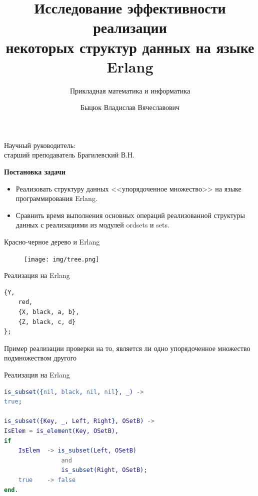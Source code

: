 \documentclass{beamer}
\title[]{Исследование эффективности реализации\\некоторых структур данных на языке Erlang}
\subtitle[ПМИ]{Прикладная математика и информатика}
\author[Быцюк В.В.]{Быцюк Владислав Вячеславович}
\date[]{}
\begin{document}

\begin{frame}
	\titlepage
	\begin{center}
		Научный руководитель:\\старший преподаватель Брагилевский В.Н.
	\end{center}
\end{frame}

\begin{frame}{\LARGE \textbf{Постановка задачи}}
	\begin{itemize}
		\item Реализовать структуру данных <<упорядоченное множество>> на языке программирования Erlang.
		\item Сравнить время выполнения основных операций реализованной структуры данных с реализациями из модулей
				ordsets и sets. 
	\end{itemize}
\end{frame}
	
	

\begin{frame}[fragile]{Красно-черное дерево и Erlang}
	\begin{figure}
		\texttt{[image: img/tree.png]}
	\end{figure}
	
	\begin{block}{Реализация на Erlang}
																																																											\begin{lstlisting}  
{Y, 
	red, 
	{X, black, a, b}, 
	{Z, black, c, d}
};		   
		\end{lstlisting}
	\end{block}	
\end{frame}
	
\begin{frame}[fragile]{Пример реализации проверки на то, является ли одно упорядоченное множество подмножеством другого}
	\begin{block}{Реализация на Erlang}
		\begin{lstlisting}[language = erlang] 	
is_subset({nil, black, nil, nil}, _) ->
true;	

is_subset({Key, _, Left, Right}, OSetB) ->
IsElem = is_element(Key, OSetB),
if
	IsElem  -> is_subset(Left, OSetB) 
				and 
				is_subset(Right, OSetB);
	true    -> false
end.
		\end{lstlisting}
	\end{block}	
\end{frame}
	
\end{document}
